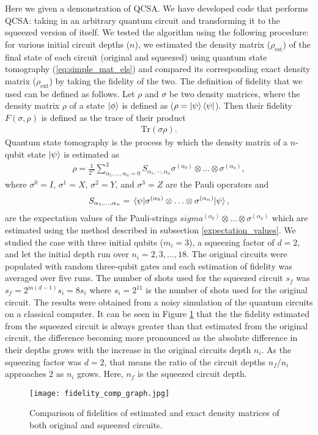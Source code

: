 \documentclass[Dual]{msu-thesis}
\begin{document}
Here we given a demonstration of QCSA. We have developed code that performs QCSA: taking in an arbitrary quantum circuit and transforming it to the squeezed version of itself. We tested the algorithm using the following procedure: for various initial circuit depths ($n$), we estimated the density matrix ($\rho_{\text{est}}$) of the final state of each circuit (original and squeezed) using quantum state tomography (\ref{eq:simple_mat_els}) and compared its corresponding exact density matrix ($\rho_{\text{ext}}$) by taking the fidelity of the two. The definition of fidelity that we used can be defined as follows. Let $\rho$ and $\sigma$ be two density matrices, where the density matrix $\rho$ of a state $\ket{\phi}$ is defined as ($\rho = \ket{\psi}\bra{\psi}$).
Then their fidelity $F(\sigma,\rho)$ is defined as the trace of their product
\begin{align}
\label{def:fidelity}
\text{Tr}(\sigma\rho).
\end{align}
Quantum state tomography is the process by which the density matrix of a $n$-qubit state $\ket{\psi}$ is estimated as
\begin{align}
\label{quantum_state_tomo}
\rho=\frac{1}{2^n}\sum_{\alpha_1,\ldots,\alpha_n=0}^3S_{\alpha_1,\cdots,\alpha_n}\sigma^{(\alpha_0)}\otimes\ldots\otimes\sigma^{(\alpha_n)},
\end{align}
where  $\sigma^0=I$, $\sigma^1=X$, $\sigma^2=Y$, and $\sigma^3=Z$ are the Pauli operators and
\begin{align}
S_{\alpha_1,\ldots,\alpha_n}
=
\mel{\psi}{\sigma^{(\alpha_0)}\otimes\ldots\otimes\sigma^{(\alpha_n)}}{\psi},
\end{align}
are the expectation values of the Pauli-strings $sigma^{(\alpha_0)}\otimes\ldots\otimes\sigma^{(\alpha_n)}$ which are estimated using the method described in subsection \ref{expectation_values}. We studied the case with three initial qubits ($m_i=3$), a squeezing factor of $d=2$, and let the initial depth run over $n_i=2,3,\ldots,18$. The original circuits were populated with random three-qubit gates and each estimation of fidelity was averaged over five runs. The number of shots used for the squeezed circuit $s_f$ was $s_f=2^{m(d-1)}s_i=8s_i$ where $s_i=2^11$ is the number of shots used for the original circuit. The results were obtained from a noisy simulation of the quantum circuits on a classical computer. It can be seen in Figure \ref{fidelity_comp_graph} that the the fidelity estimated from the squeezed circuit is always greater than that estimated from the original circuit, the difference becoming more pronounced as the absolute difference in their depths grows with the increase in the original circuits depth $n_i$. As the squeezing factor was $d=2$, that means the ratio of the circuit depths $n_f/n_i$ approaches 2 as $n_i$ grows. Here, $n_f$ is the squeezed circuit depth.
\begin{figure}[H]
    \centering
    \texttt{[image: fidelity\_comp\_graph.jpg]}
    \caption{Comparison of fidelities of estimated and exact density matrices of both original and squeezed circuits.}
    \label{fidelity_comp_graph}
\end{figure}
\end{document}
